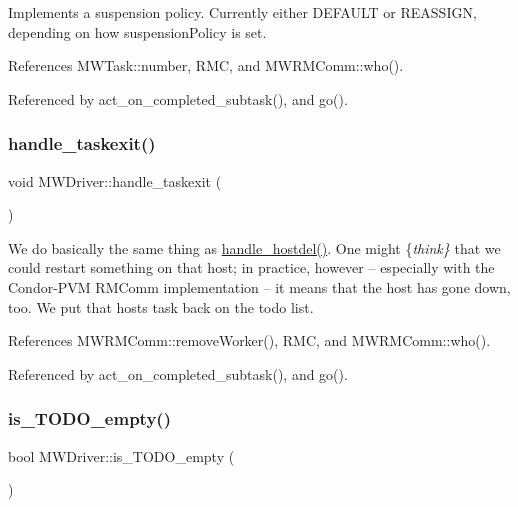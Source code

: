 Implements a suspension policy. Currently either D\+E\+F\+A\+U\+LT or R\+E\+A\+S\+S\+I\+GN, depending on how suspension\+Policy is set. 

References M\+W\+Task\+::number, R\+MC, and M\+W\+R\+M\+Comm\+::who().



Referenced by act\+\_\+on\+\_\+completed\+\_\+subtask(), and go().

\mbox{\label{classMWDriver_ab4ee1fc1cbc9f5e07e3083f499d29be0}} 
\subsubsection{\texorpdfstring{handle\+\_\+taskexit()}{handle\_taskexit()}}
{\footnotesize\ttfamily void M\+W\+Driver\+::handle\+\_\+taskexit (\begin{DoxyParamCaption}{ }\end{DoxyParamCaption})\hspace{0.3cm}{\ttfamily [virtual]}}

We do basically the same thing as \hyperlink{classMWDriver_af6c437b207bd8d327ceb84c5ce0c4304}{handle\+\_\+hostdel()}. One might \{{\itshape think\}} that we could restart something on that host; in practice, however -- especially with the Condor-\/\+P\+VM R\+M\+Comm implementation -- it means that the host has gone down, too. We put that host\textquotesingle{}s task back on the todo list. 

References M\+W\+R\+M\+Comm\+::remove\+Worker(), R\+MC, and M\+W\+R\+M\+Comm\+::who().



Referenced by act\+\_\+on\+\_\+completed\+\_\+subtask(), and go().

\mbox{\label{classMWDriver_a184d950e15be4aa0ecb22d7eaea622fe}} 
\subsubsection{\texorpdfstring{is\+\_\+\+T\+O\+D\+O\+\_\+empty()}{is\_TODO\_empty()}}
{\footnotesize\ttfamily bool M\+W\+Driver\+::is\+\_\+\+T\+O\+D\+O\+\_\+empty (\begin{DoxyParamCaption}{ }\end{DoxyParamCaption})}

